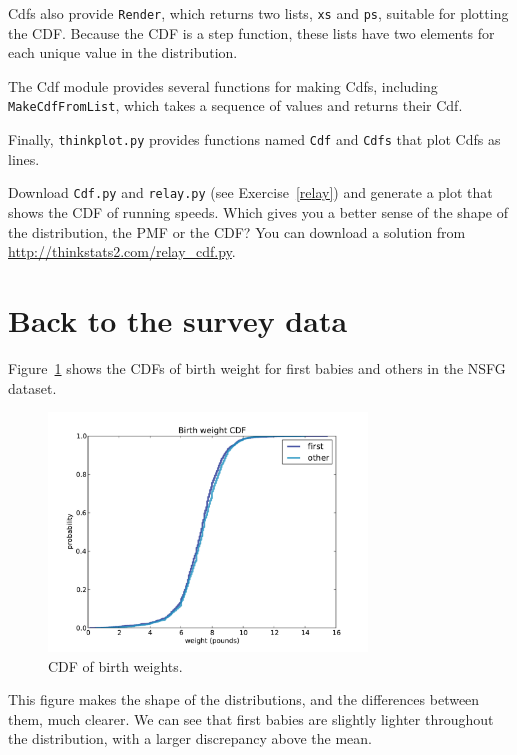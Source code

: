 \documentclass[12pt]{book}
\begin{document}
Cdfs also provide {\tt Render}, which returns two lists, {\tt xs} and
{\tt ps}, suitable for plotting the CDF.  Because the CDF is a
step function, these lists have two elements for each unique
value in the distribution.

The Cdf module provides several functions for making Cdfs, including
{\tt MakeCdfFromList}, which takes a sequence of values
and returns their Cdf.

Finally, {\tt thinkplot.py} provides functions named {\tt Cdf} and
{\tt Cdfs} that plot Cdfs as lines.

\begin{exercise}
Download {\tt Cdf.py} and \verb"relay.py" (see
Exercise~\ref{relay}) and generate a plot that shows the CDF of
running speeds.  Which gives you a better sense of the shape of the
distribution, the PMF or the CDF?  You can download a solution
from \url{http://thinkstats2.com/relay_cdf.py}.

\end{exercise}


\section{Back to the survey data}
\label{birth_weights}

Figure~\ref{nsfg_birthwgt_cdf} shows the CDFs of birth weight for
first babies and others in the NSFG dataset.

\begin{figure}
\centerline{\includegraphics[height=2.5in]{figs/nsfg_birthwgt_cdf.pdf}}
\caption{CDF of birth weights.}
\label{nsfg_birthwgt_cdf}
\end{figure}

This figure makes the shape of the distributions, and the differences
between them, much clearer.  We can see that first babies are slightly
lighter throughout the distribution, with a larger discrepancy above 
the mean.
\end{document}
